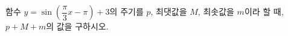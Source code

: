 함수 $y=\sin\left(\dfrac{\pi}{3}x-\pi\right)+3$의 주기를 $p$, 최댓값을 $M$, 최솟값을 $m$이라 할 때, $p+M+m$의 값을 구하시오.
